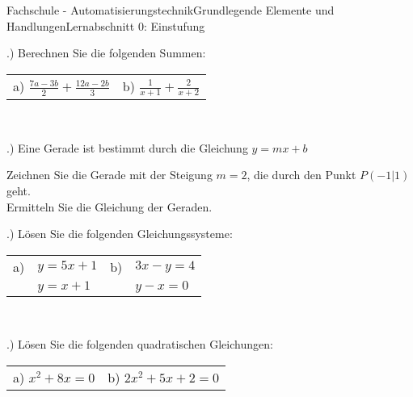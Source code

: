 \documentclass[oneside,openany,headings=optiontotoc,11pt,numbers=noenddot]{scrreprt}
\begin{document}
\begin{worksheet}{Fachschule - Automatisierungstechnik}{Grundlegende Elemente und Handlungen}{Lernabschnitt 0: Einstufung}
\begin{framed}
			\par{}.) Berechnen Sie die folgenden Summen:\\
			\par\noindent
			\begin{tabularx}{\textwidth}{ll}
				a) \(\frac{7a-3b}{2}+\frac{12a-2b}{3}\) & b) \(\frac{1}{x+1}+\frac{2}{x+2}\)
			\end{tabularx}\\
			\par{}.) Eine Gerade ist bestimmt durch die Gleichung \(y = mx + b\)\\
			\par\noindent
			Zeichnen Sie die Gerade mit der Steigung \(m=2\), die durch den Punkt \(P(-1|1)\) geht.\\
			Ermitteln Sie die Gleichung der Geraden.\\
			\par{}.) Lösen Sie die folgenden Gleichungssysteme:\\
			\par\noindent
			\begin{tabularx}{\textwidth}{llll}
				a) & \(y = 5x + 1\) & b) & \(3x-y = 4\)\\
				& \(y = x+1\) & & \(y-x = 0\)
			\end{tabularx}\\
			\par{}.) Lösen Sie die folgenden quadratischen Gleichungen:\\
			\par\noindent
			\begin{tabularx}{\textwidth}{ll}
				a) \(x^2+8x = 0\) & b) \(2x^2+5x+2 = 0\)
			\end{tabularx}\\
		\end{framed}
	\end{worksheet}
\end{document}
